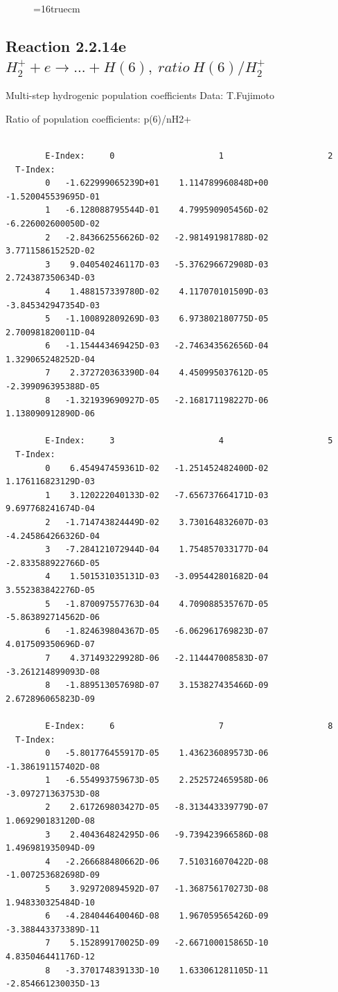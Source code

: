 \documentclass[12pt,dvips]{article}
\begin{document}
\begin{figure} \label{2.2.14d}
\epsfxsize=16truecm
\end{figure}
\newpage


\subsection{
Reaction 2.2.14e $ H_2^+ + e \rightarrow ...+ H(6) , \   ratio ~ H(6)/H_2^+  $
}

 Multi-step hydrogenic population coefficients
 Data: T.Fujimoto

 Ratio of population coefficients: p(6)/nH2+

\begin{small}\begin{verbatim}

        E-Index:     0                     1                     2
  T-Index:
        0   -1.622999065239D+01    1.114789960848D+00   -1.520045539695D-01
        1   -6.128088795544D-01    4.799590905456D-02   -6.226002600050D-02
        2   -2.843662556626D-02   -2.981491981788D-02    3.771158615252D-02
        3    9.040540246117D-03   -5.376296672908D-03    2.724387350634D-03
        4    1.488157339780D-02    4.117070101509D-03   -3.845342947354D-03
        5   -1.100892809269D-03    6.973802180775D-05    2.700981820011D-04
        6   -1.154443469425D-03   -2.746343562656D-04    1.329065248252D-04
        7    2.372720363390D-04    4.450995037612D-05   -2.399096395388D-05
        8   -1.321939690927D-05   -2.168171198227D-06    1.138090912890D-06

        E-Index:     3                     4                     5
  T-Index:
        0    6.454947459361D-02   -1.251452482400D-02    1.176116823129D-03
        1    3.120222040133D-02   -7.656737664171D-03    9.697768241674D-04
        2   -1.714743824449D-02    3.730164832607D-03   -4.245864266326D-04
        3   -7.284121072944D-04    1.754857033177D-04   -2.833588922766D-05
        4    1.501531035131D-03   -3.095442801682D-04    3.552383842276D-05
        5   -1.870097557763D-04    4.709088535767D-05   -5.863892714562D-06
        6   -1.824639804367D-05   -6.062961769823D-07    4.017509350696D-07
        7    4.371493229928D-06   -2.114447008583D-07   -3.261214899093D-08
        8   -1.889513057698D-07    3.153827435466D-09    2.672896065823D-09

        E-Index:     6                     7                     8
  T-Index:
        0   -5.801776455917D-05    1.436236089573D-06   -1.386191157402D-08
        1   -6.554993759673D-05    2.252572465958D-06   -3.097271363753D-08
        2    2.617269803427D-05   -8.313443339779D-07    1.069290183120D-08
        3    2.404364824295D-06   -9.739423966586D-08    1.496981935094D-09
        4   -2.266688480662D-06    7.510316070422D-08   -1.007253682698D-09
        5    3.929720894592D-07   -1.368756170273D-08    1.948330325484D-10
        6   -4.284044640046D-08    1.967059565426D-09   -3.388443373389D-11
        7    5.152899170025D-09   -2.667100015865D-10    4.835046441176D-12
        8   -3.370174839133D-10    1.633061281105D-11   -2.854661230035D-13


\end{verbatim}
\end{small}
\end{document}
